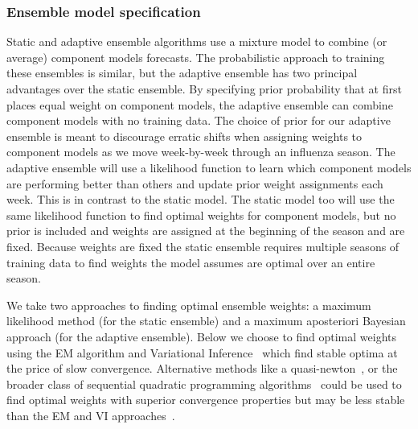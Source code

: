 \documentclass[sagev,times,Review,10pt]{sagej}
\begin{document}
\subsubsection{Ensemble model specification}
Static and adaptive ensemble algorithms use a mixture model to combine (or average) component models forecasts.
The probabilistic approach to training these ensembles is similar, but the adaptive ensemble has two principal advantages over the static ensemble.
By specifying prior probability that at first places equal weight on component models, the adaptive ensemble can combine component models with no training data.
The choice of prior for our adaptive ensemble is meant to discourage erratic shifts when assigning weights to component models as we move week-by-week through an influenza season.
The adaptive ensemble will use a likelihood function to learn which component models are performing better than others and update prior weight assignments each week.
This is in contrast to the static model.
The static model too will use the same likelihood function to find optimal weights for component models, but no prior is included and weights are assigned at the beginning of the season and are fixed.
Because weights are fixed the static ensemble requires multiple seasons of training data to find weights the model assumes are optimal over an entire season.

We take two approaches to finding optimal ensemble weights: a maximum likelihood method (for the static ensemble) and a maximum aposteriori Bayesian approach (for the adaptive ensemble).
Below we choose to find optimal weights using the EM algorithm and Variational Inference~\citep{dempster1977maximum,blei2017variational,rustagi1976variational} which find stable optima at the price of slow convergence.
Alternative methods like a quasi-newton~\cite{bertsekas2014constrained}, or the broader class of sequential quadratic programming algorithms~\citep{nocedal2006sequential} could be used to find optimal weights with superior convergence properties but may be less stable than the EM and VI approaches~\citep{sqp}. 
\end{document}
